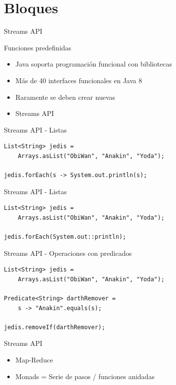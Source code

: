 \documentclass{beamer}
\begin{document}
\section{Bloques}
\begin{frame}
\huge Streams API
\end{frame}


\begin{frame}{Funciones predefinidas}
	\begin{itemize}
	\item Java soporta programación funcional con bibliotecas
	\item Más de 40 interfaces funcionales en Java 8
	\item Raramente se deben crear nuevas
	\item Streams API
	\end{itemize}
\end{frame}


\begin{frame}[fragile]{Streams API - Listas}
\begin{lstlisting}
List<String> jedis = 
	Arrays.asList("ObiWan", "Anakin", "Yoda");

jedis.forEach(s -> System.out.println(s);
\end{lstlisting}
\end{frame}


\begin{frame}[fragile]{Streams API - Listas}
\begin{lstlisting}
List<String> jedis = 
	Arrays.asList("ObiWan", "Anakin", "Yoda");

jedis.forEach(System.out::println);

\end{lstlisting}
\end{frame}


\begin{frame}[fragile]{Streams API - Operaciones con predicados}
\begin{lstlisting}
List<String> jedis = 
	Arrays.asList("ObiWan", "Anakin", "Yoda");

Predicate<String> darthRemover = 
	s -> "Anakin".equals(s);
	
jedis.removeIf(darthRemover);
\end{lstlisting}
\end{frame}

\begin{frame}[fragile]{Streams API}
	\begin{itemize}
	\item Map-Reduce
	\item Monads = Serie de pasos / funciones anidadas
	\end{itemize}
	
\end{frame}
\end{document}
